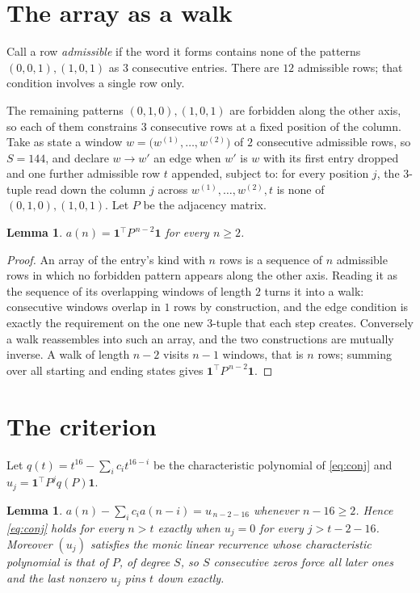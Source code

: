 \documentclass[11pt,a4paper]{article}
\theoremstyle{plain}
\newtheorem{lemma}[theorem]{Lemma}
\theoremstyle{definition}
\begin{document}
\section{The array as a walk}

Call a row \emph{admissible} if the word it forms contains none of the patterns
$(0,0,1), (1,0,1)$ as $3$ consecutive entries. There are $12$ admissible rows; that condition
involves a single row only.

The remaining patterns $(0,1,0), (1,0,1)$ are forbidden along the other axis, so each of them
constrains $3$ consecutive rows at a fixed position of the column. Take as state a
window $w=\bigl(w^{(1)},\dots,w^{(2)}\bigr)$ of $2$ consecutive admissible
rows, so $S=144$, and declare $w\to w'$ an edge when $w'$ is $w$ with its first entry
dropped and one further admissible row $t$ appended, subject to: for every position
$j$, the $3$-tuple read down the column $j$ across $w^{(1)},\dots,w^{(2)},t$
is none of $(0,1,0), (1,0,1)$. Let $P$ be the adjacency matrix.

\begin{lemma}\label{lem:walk}
$a(n)=\mathbf{1}^{\!\top}P^{\,n-2}\mathbf{1}$ for every $n\ge2$.
\end{lemma}

\begin{proof}
An array of the entry's kind with $n$ rows is a sequence of $n$ admissible rows in
which no forbidden pattern appears along the other axis. Reading it as the sequence of its
overlapping windows of length $2$ turns it into a walk: consecutive windows overlap in
$1$ rows by construction, and the edge condition is exactly the requirement on the one
new $3$-tuple that each step creates. Conversely a walk reassembles into such an array,
and the two constructions are mutually inverse. A walk of length $n-2$ visits $n-1$
windows, that is $n$ rows; summing over all starting and ending states gives
$\mathbf{1}^{\!\top}P^{\,n-2}\mathbf{1}$.
\end{proof}

\section{The criterion}

Let $q(t)=t^{16}-\sum_i c_i t^{16-i}$ be the characteristic polynomial of
\eqref{eq:conj} and $u_j=\mathbf{1}^{\!\top}P^{j}q(P)\mathbf{1}$.

\begin{lemma}\label{lem:crit}
$a(n)-\sum_i c_i a(n-i)=u_{\,n-2-16}$ whenever $n-16\ge2$. Hence
\eqref{eq:conj} holds for every $n>t$ exactly when $u_j=0$ for every
$j>t-2-16$. Moreover $(u_j)$ satisfies the monic linear recurrence whose
characteristic polynomial is that of $P$, of degree $S$, so $S$ consecutive zeros force all
later ones and the last nonzero $u_j$ pins $t$ down exactly.
\end{lemma}
\end{document}
